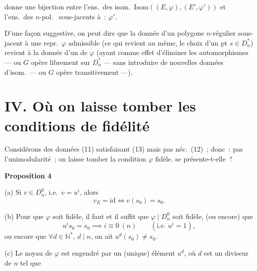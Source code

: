 \documentclass[11pt,a4paper]{article}
\begin{document}

donne une bijection  entre l'ens.\ des isom.\ $\mathrm{Isom}((E,\varphi),(E',\varphi'))$ et l'ens.\ des $n$-pol.\   sous-jacents à~: $\varphi'$.

D'une façon suggestive, on peut dire que la donnée d'un polygone $n$-régulier sous-jacent à une repr.\ $\varphi$ admissible (ce qui revient au même, le choix d'un pt $s \in D_n^{*}$) revient à la donnée d'un  de $\varphi$ (ayant comme effet d'éliminer les automorphismes --- ou $G$ opère librement sur $D_n^{*}$ --- sans introduire de nouvelles données d'isom.\ --- ou $G$ opère transitivement ---).

\section{IV. Où on laisse tomber les conditions de fidélité}

Considérons des données (11) satisfaisant (13) mais pas néc.\ (12)~; donc~: pas l'unimodularité~; on laisse tomber la condition $\varphi$ fidèle.  se présente-t-elle~?

\textbf{Proposition 4} 

(a) Si $v \in D_n^{0}$, i.e.\ $v = u^{i}$, alors
\[
  v_E = \mathrm{id} \iff v(s_0) = s_0 .
\]

(b) Pour que $\varphi$ soit fidèle, il faut et il suffit que $\varphi \mid D_n^{0}$ soit fidèle, \struck{\ill{}} (ou encore) que
\[
  u^{i} s_0 = s_0 \implies i \equiv 0 \ (n) \qquad (\text{i.e. } u^{i} = 1),
\]
ou encore que $\forall d \in \mathbb{N}^{*}$, $d \mid n$, on ait $u^{d}(s_0) \neq s_0$.

(c)  Le noyau de $\varphi$ \struck{\ill{}} est engendré par un (unique) élément $u^{d}$, où \struck{\ill{}} $d$ est un diviseur de $n$ tel que    
\end{document}
